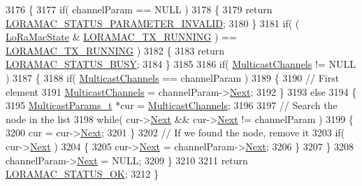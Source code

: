 \begin{DoxyCode}
3176 \{
3177     \textcolor{keywordflow}{if}( channelParam == NULL )
3178     \{
3179         \textcolor{keywordflow}{return} \mbox{\hyperlink{group___l_o_r_a_m_a_c_gga1d18f26b344040b3ec5c3db662919661ad0d3119f247d00e1787dda106fcb3017}{LORAMAC\_STATUS\_PARAMETER\_INVALID}};
3180     \}
3181     \textcolor{keywordflow}{if}( ( \mbox{\hyperlink{_lo_ra_mac_8c_a53bc4ca09907ed24a1be62fa76c310ca}{LoRaMacState}} & \mbox{\hyperlink{_lo_ra_mac_8c_ada0bdc03d52b5bf536f021dcea7c4490a5b4a3679d3966d49741f0aec6b15d731}{LORAMAC\_TX\_RUNNING}} ) == 
      \mbox{\hyperlink{_lo_ra_mac_8c_ada0bdc03d52b5bf536f021dcea7c4490a5b4a3679d3966d49741f0aec6b15d731}{LORAMAC\_TX\_RUNNING}} )
3182     \{
3183         \textcolor{keywordflow}{return} \mbox{\hyperlink{group___l_o_r_a_m_a_c_gga1d18f26b344040b3ec5c3db662919661a66b12f569207eacd97ee1c1d6c4cee6d}{LORAMAC\_STATUS\_BUSY}};
3184     \}
3185 
3186     \textcolor{keywordflow}{if}( \mbox{\hyperlink{_lo_ra_mac_8c_aca81cdf8cb24b9a7e02f40d0b9565013}{MulticastChannels}} != NULL )
3187     \{
3188         \textcolor{keywordflow}{if}( \mbox{\hyperlink{_lo_ra_mac_8c_aca81cdf8cb24b9a7e02f40d0b9565013}{MulticastChannels}} == channelParam )
3189         \{
3190           \textcolor{comment}{// First element}
3191           \mbox{\hyperlink{_lo_ra_mac_8c_aca81cdf8cb24b9a7e02f40d0b9565013}{MulticastChannels}} = channelParam->\mbox{\hyperlink{structs_multicast_params_ac9765374ff15c55462baa90d1331b3b4}{Next}};
3192         \}
3193         \textcolor{keywordflow}{else}
3194         \{
3195             \mbox{\hyperlink{structs_multicast_params}{MulticastParams\_t}} *cur = \mbox{\hyperlink{_lo_ra_mac_8c_aca81cdf8cb24b9a7e02f40d0b9565013}{MulticastChannels}};
3196 
3197             \textcolor{comment}{// Search the node in the list}
3198             \textcolor{keywordflow}{while}( cur->\mbox{\hyperlink{structs_multicast_params_ac9765374ff15c55462baa90d1331b3b4}{Next}} && cur->\mbox{\hyperlink{structs_multicast_params_ac9765374ff15c55462baa90d1331b3b4}{Next}} != channelParam )
3199             \{
3200                 cur = cur->\mbox{\hyperlink{structs_multicast_params_ac9765374ff15c55462baa90d1331b3b4}{Next}};
3201             \}
3202             \textcolor{comment}{// If we found the node, remove it}
3203             \textcolor{keywordflow}{if}( cur->\mbox{\hyperlink{structs_multicast_params_ac9765374ff15c55462baa90d1331b3b4}{Next}} )
3204             \{
3205                 cur->\mbox{\hyperlink{structs_multicast_params_ac9765374ff15c55462baa90d1331b3b4}{Next}} = channelParam->\mbox{\hyperlink{structs_multicast_params_ac9765374ff15c55462baa90d1331b3b4}{Next}};
3206             \}
3207         \}
3208         channelParam->\mbox{\hyperlink{structs_multicast_params_ac9765374ff15c55462baa90d1331b3b4}{Next}} = NULL;
3209     \}
3210 
3211     \textcolor{keywordflow}{return} \mbox{\hyperlink{group___l_o_r_a_m_a_c_gga1d18f26b344040b3ec5c3db662919661a03db5fca052313edb3823c014b653a74}{LORAMAC\_STATUS\_OK}};
3212 \}
\end{DoxyCode}
